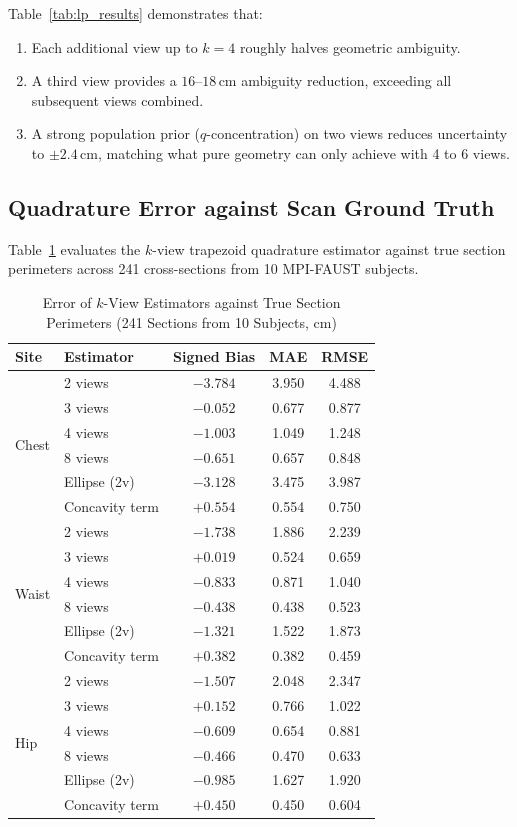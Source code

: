 \documentclass[journal]{IEEEtran}
\begin{document}
Table~\ref{tab:lp_results} demonstrates that:
\begin{enumerate}
    \item Each additional view up to $k=4$ roughly halves geometric ambiguity.
    \item A third view provides a $16$--$18$\,cm ambiguity reduction, exceeding all subsequent views combined.
    \item A strong population prior ($q$-concentration) on two views reduces uncertainty to $\pm 2.4$\,cm, matching what pure geometry can only achieve with 4 to 6 views.
\end{enumerate}

\subsection{Quadrature Error against Scan Ground Truth}
Table~\ref{tab:quadrature_eval} evaluates the $k$-view trapezoid quadrature estimator against true section perimeters across 241 cross-sections from 10 MPI-FAUST subjects.

\begin{table}[!t]
\caption{Error of $k$-View Estimators against True Section Perimeters (241 Sections from 10 Subjects, cm)}
\label{tab:quadrature_eval}
\centering
\begin{tabular}{llccc}
\toprule
\textbf{Site} & \textbf{Estimator} & \textbf{Signed Bias} & \textbf{MAE} & \textbf{RMSE} \\
\midrule
\multirow{6}{*}{Chest} 
& 2 views & $-3.784$ & 3.950 & 4.488 \\
& 3 views & $-0.052$ & 0.677 & 0.877 \\
& 4 views & $-1.003$ & 1.049 & 1.248 \\
& 8 views & $-0.651$ & 0.657 & 0.848 \\
& Ellipse (2v) & $-3.128$ & 3.475 & 3.987 \\
& Concavity term & $+0.554$ & 0.554 & 0.750 \\
\midrule
\multirow{6}{*}{Waist} 
& 2 views & $-1.738$ & 1.886 & 2.239 \\
& 3 views & $+0.019$ & 0.524 & 0.659 \\
& 4 views & $-0.833$ & 0.871 & 1.040 \\
& 8 views & $-0.438$ & 0.438 & 0.523 \\
& Ellipse (2v) & $-1.321$ & 1.522 & 1.873 \\
& Concavity term & $+0.382$ & 0.382 & 0.459 \\
\midrule
\multirow{6}{*}{Hip} 
& 2 views & $-1.507$ & 2.048 & 2.347 \\
& 3 views & $+0.152$ & 0.766 & 1.022 \\
& 4 views & $-0.609$ & 0.654 & 0.881 \\
& 8 views & $-0.466$ & 0.470 & 0.633 \\
& Ellipse (2v) & $-0.985$ & 1.627 & 1.920 \\
& Concavity term & $+0.450$ & 0.450 & 0.604 \\
\bottomrule
\end{tabular}
\end{table}
\end{document}
